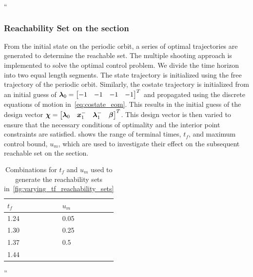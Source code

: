 \documentclass[11pt]{article}
\newenvironment{correction}{\begin{list}{}{\setlength{\leftmargin}{1cm}\setlength{\rightmargin}{1cm}}\vspace{\parsep}\item[]``}{''\end{list}}
\begin{document}
\begin{itemize}
\begin{correction}
            \subsubsection{Reachability Set on the \Poincare section}
            From the initial state on the periodic orbit, a series of optimal trajectories are generated to determine the reachable set.
            The multiple shooting approach is implemented to solve the optimal control problem. 
            We divide the time horizon into two equal length segments. 
            The state trajectory is initialized using the free trajectory of the periodic orbit. 
            Similarly, the costate trajectory is initialized from an initial guess of \( \bm{\lambda}_0 = \begin{bmatrix} -1 & -1 & -1 & -1\end{bmatrix}^T\) and propagated using the discrete equations of motion in~\cref{eq:costate_eom}.
            This results in the initial guess of the design vector \( \bm{\chi} = \begin{bmatrix} \bm{\lambda}_0 & \bm{x}_1^{-} & \bm{\lambda}_1^{-} & \bm{\beta} \end{bmatrix}^T\).
            This design vector is then varied to ensure that the necessary conditions of optimality and the interior point constraints are satisfied. 
             shows the range of terminal times, \( t_f \), and maximum control bound, \( u_m \), which are used to investigate their effect on the subsequent reachable set on the \Poincare section.
            \begin{table}
                \centering
                \begin{tabular}{ll}  
                    \toprule
                    \(t_f\) & \( u_m \) \\
                    \midrule
                    1.24 & 0.05 \\
                    1.30 & 0.25 \\
                    1.37 & 0.5 \\
                    1.44 & \\
                    \bottomrule
                \end{tabular}
                \caption{Combinations for \( t_f \) and \( u_m\) used to generate the reachability sets in~\cref{fig:varying_tf_reachability_sets}}
            \end{table}


\end{correction}
\end{itemize}
\end{document}
